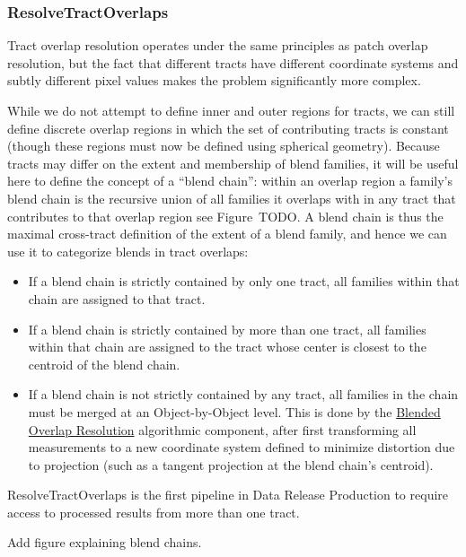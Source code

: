 \subsubsection{ResolveTractOverlaps}
\label{sec:drpResolveTractOverlaps}

Tract overlap resolution operates under the same principles as patch overlap resolution, but the fact that different tracts have different coordinate systems and subtly different pixel values makes the problem significantly more complex.

While we do not attempt to define inner and outer regions for tracts, we can still define discrete overlap regions in which the set of contributing tracts is constant (though these regions must now be defined using spherical geometry).  Because tracts may differ on the extent and membership of blend families, it will be useful here to define the concept of a ``blend chain'': within an overlap region a family's blend chain is the recursive union of all families it overlaps with in any tract that contributes to that overlap region see Figure~TODO.  A blend chain is thus the maximal cross-tract definition of the extent of a blend family, and hence we can use it to categorize blends in tract overlaps:
\begin{itemize}
\item If a blend chain is strictly contained by only one tract, all families within that chain are assigned to that tract.
\item If a blend chain is strictly contained by more than one tract, all families within that chain are assigned to the tract whose center is closest to the centroid of the blend chain.
\item If a blend chain is not strictly contained by any tract, all families in the chain must be merged at an Object-by-Object level.  This is done by the \hyperref[sec:acBlendedOverlapResolution]{Blended Overlap Resolution} algorithmic component, after first transforming all measurements to a new coordinate system defined to minimize distortion due to projection (such as a tangent projection at the blend chain's centroid).
\end{itemize}

ResolveTractOverlaps is the first pipeline in Data Release Production to require access to processed results from more than one tract.

\begin{note}[TODO]
  Add figure explaining blend chains.
\end{note}

